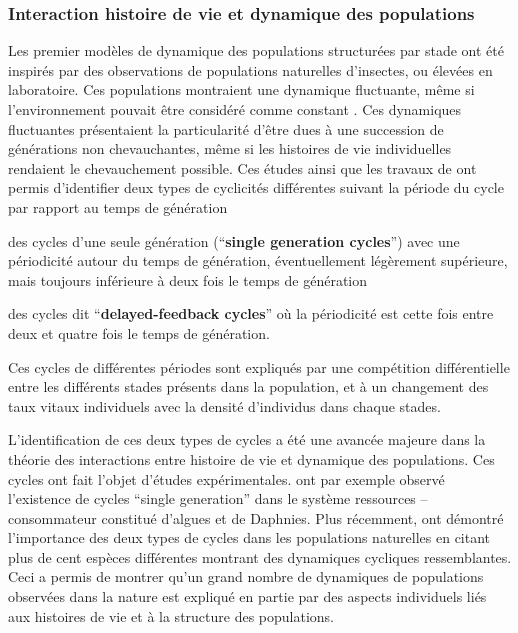 \subsubsection{Interaction histoire de vie et dynamique des populations}
\label{modelPopStru}
Les premier modèles de dynamique des populations structurées par stade
\autocites{gurney1980a,gurney1983a,nisbet1983a,lawton1981a} ont été inspirés par
des observations de populations naturelles d'insectes, ou élevées en
laboratoire.
Ces populations montraient une dynamique fluctuante, même si l'environnement
pouvait être considéré comme constant
\autocites{nicholson1954a,gurney1983a,ebenman1988a,godfray1989a}. Ces dynamiques
fluctuantes présentaient la particularité d'être dues à une succession de
générations non chevauchantes, même si les histoires de vie individuelles
rendaient le chevauchement possible. Ces études ainsi que les travaux de
\textcite{gurney1985a} ont permis d'identifier deux types de cyclicités
différentes suivant la période du cycle par rapport au temps de génération
\begin{enumerate*}[label=(\roman*), before=\unskip{ : }, itemjoin={{ ; }},
itemjoin*={{ ; et }}]
  \item des cycles d'une seule génération (``\textbf{single generation
  cycles}'') avec une périodicité autour du temps de génération, éventuellement légèrement
  supérieure, mais toujours inférieure à deux fois le temps de génération \item
  des cycles dit ``\textbf{delayed-feedback cycles}'' où la périodicité est
  cette fois entre deux et quatre fois le temps de génération.
\end{enumerate*} 
Ces cycles de différentes périodes sont expliqués par une compétition
différentielle entre les différents stades présents dans la population, et à un
changement des taux vitaux individuels avec la densité d'individus dans chaque
stades.

L'identification de ces deux types de cycles a été une avancée majeure dans la
théorie des interactions entre histoire de vie et dynamique des populations. 
Ces cycles ont fait l'objet d'études expérimentales.
\textcite{mccauley1987a} ont par exemple observé l'existence de cycles ``single
generation'' dans le système ressources -- consommateur constitué d'algues et de
Daphnies. Plus récemment, \textcite{murdoch2002a} ont démontré l'importance des
deux types de cycles dans les populations naturelles en citant plus de cent
espèces différentes montrant des dynamiques cycliques ressemblantes. Ceci a
permis de montrer qu'un grand nombre de dynamiques de populations observées dans
la nature est expliqué en partie par des aspects individuels liés aux
histoires de vie et à la structure des populations.

